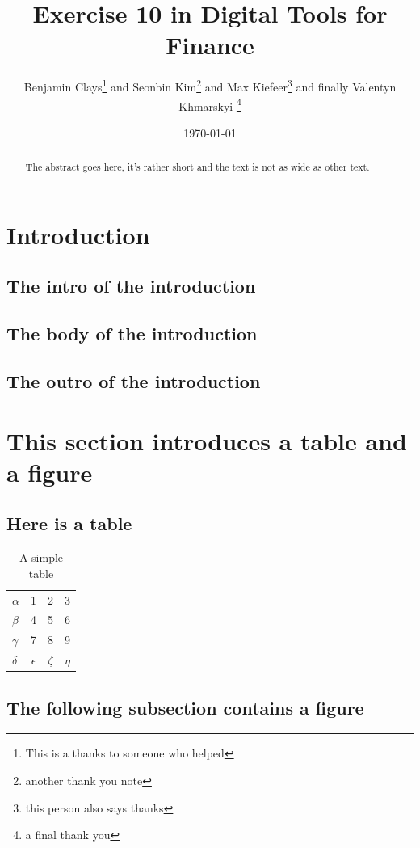 \documentclass[titlepage]{article}
\title{Exercise 10 in Digital Tools for Finance}
\author{Benjamin Clays\thanks{This is a thanks to someone who helped} and Seonbin Kim\thanks{another thank you note} and Max Kiefeer\thanks{this person also says thanks} and finally Valentyn Khmarskyi \thanks{a final thank you}}
\affil{Faculty of Business, Economics and Informatics, UZH}
\date{\today}
\begin{document}
\maketitle

\begin{abstract}
The abstract goes here, it's rather short and the text is not as wide as other text.

\end{abstract}

\section{Introduction}
\subsection{The intro of the introduction}
\blindtext[1]
\subsection{The body of the introduction}
\blindtext[5]
\subsection{The outro of the introduction}
\blindtext[2]

\section{This section introduces a table and a figure}
\subsection{Here is a table}

\begin{table}[h]
  \centering
    \begin{tabular}{| l c c r |}
    \hline
    $\alpha$ & 1 & 2 & 3 \\
    $\beta$ & 4 & 5 & 6 \\
    $\gamma$ & 7 & 8 & 9 \\
    $\delta$ & $\epsilon$ & $\zeta$ & $\eta$\\
    \hline
    \end{tabular}
  \caption{A simple table \protect\footnotemark[1]}
\end{table}

\subsection{The following subsection contains a figure}
\end{document}
